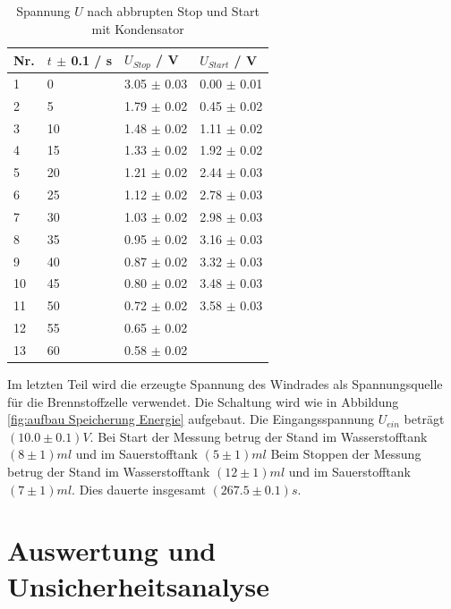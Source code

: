 \documentclass[12pt,a4paper,twoside]{article}
\begin{document}
\begin{table}[H]
    \centering
    \caption{Spannung $U$ nach abbrupten Stop und Start mit Kondensator}
    \label{tab:Messdaten Windkraft abbrupt stop kondensator}
    \begin{tabular}{| l | l | l | l |}
        \hline
        Nr. & $t$ $\pm $ 0.1 / s & $U_{Stop}$ / V & $U_{Start}$ / V \\
        \hline
        1  & 0  & 3.05 $\pm$ 0.03  & 0.00 $\pm$ 0.01  \\
        2  & 5  & 1.79 $\pm$ 0.02  & 0.45 $\pm$ 0.02  \\
        3  & 10 & 1.48 $\pm$ 0.02  & 1.11 $\pm$ 0.02  \\
        4  & 15 & 1.33 $\pm$ 0.02  & 1.92 $\pm$ 0.02  \\
        5  & 20 & 1.21 $\pm$ 0.02  & 2.44 $\pm$ 0.03  \\
        6  & 25 & 1.12 $\pm$ 0.02  & 2.78 $\pm$ 0.03  \\
        7  & 30 & 1.03 $\pm$ 0.02  & 2.98 $\pm$ 0.03  \\
        8  & 35 & 0.95 $\pm$ 0.02  & 3.16 $\pm$ 0.03  \\
        9  & 40 & 0.87 $\pm$ 0.02  & 3.32 $\pm$ 0.03  \\
        10 & 45 & 0.80 $\pm$ 0.02  & 3.48 $\pm$ 0.03  \\
        11 & 50 & 0.72 $\pm$ 0.02  & 3.58 $\pm$ 0.03  \\
        12 & 55 & 0.65 $\pm$ 0.02  &   \\
        13 & 60 & 0.58 $\pm$ 0.02  &   \\
        \hline  
    \end{tabular}
\end{table}

\noindent
Im letzten Teil wird die erzeugte Spannung des Windrades als Spannungsquelle für die Brennstoffzelle verwendet. 
Die Schaltung wird wie in Abbildung \ref{fig:aufbau Speicherung Energie} aufgebaut. 
Die Eingangsspannung $U_{ein}$ beträgt $(10.0 \pm 0.1)V$. Bei Start der Messung betrug der Stand im Wasserstofftank $(8 \pm 1)ml$ und im Sauerstofftank $(5 \pm 1)ml$
Beim Stoppen der Messung betrug der Stand im Wasserstofftank $(12 \pm 1)ml$ und im Sauerstofftank $(7 \pm 1)ml$. Dies dauerte insgesamt $(267.5 \pm 0.1) s$. 


\section{Auswertung und Unsicherheitsanalyse} %
\end{document}

